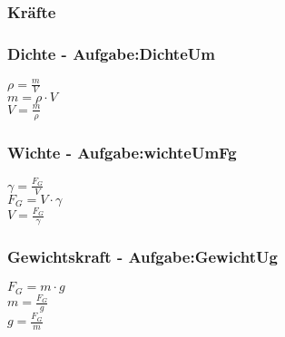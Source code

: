 \subsubsection{Kräfte} 
\begin{minipage}{0.45\textwidth} 
\end{minipage} 
\begin{minipage}{0.45\textwidth} 
 
\end{minipage} 
\subsubsection{Dichte - Aufgabe:DichteUm} 
\begin{minipage}{0.45\textwidth} 
$ \rho  = \frac{m}{V} $\\ 
$ m = \rho \cdot V $\\ 
$ V = \frac{m}{\rho } $\\ 
\end{minipage} 
\begin{minipage}{0.45\textwidth} 
 
\end{minipage} 
\subsubsection{Wichte - Aufgabe:wichteUmFg} 
\begin{minipage}{0.45\textwidth} 
$ \gamma  = \frac{F_{G} }{V} $\\ 
$ F_{G}  = V\cdot \gamma $\\ 
$ V = \frac{F_{G} }{\gamma } $\\ 
\end{minipage} 
\begin{minipage}{0.45\textwidth} 
 
\end{minipage} 
\subsubsection{Gewichtskraft - Aufgabe:GewichtUg} 
\begin{minipage}{0.45\textwidth} 
$ F_{G}  = m\cdot g $\\ 
$ m = \frac{F_{G} }{g} $\\ 
$ g = \frac{F_{G} }{m} $\\ 
\end{minipage} 
\begin{minipage}{0.45\textwidth} 
 
\end{minipage} 
